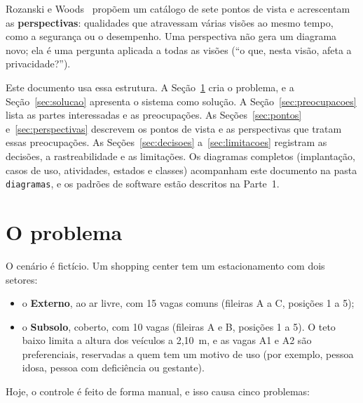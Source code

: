 Rozanski e Woods~\cite{rozanski2011} propõem um catálogo de sete pontos de vista e acrescentam as \textbf{perspectivas}: qualidades que atravessam várias visões ao mesmo tempo, como a segurança ou o desempenho. Uma perspectiva não gera um diagrama novo; ela é uma pergunta aplicada a todas as visões (``o que, nesta visão, afeta a privacidade?'').

Este documento usa essa estrutura. A Seção~\ref{sec:problema} cria o problema, e a Seção~\ref{sec:solucao} apresenta o sistema como solução. A Seção~\ref{sec:preocupacoes} lista as partes interessadas e as preocupações. As Seções~\ref{sec:pontos} e~\ref{sec:perspectivas} descrevem os pontos de vista e as perspectivas que tratam essas preocupações. As Seções~\ref{sec:decisoes} a~\ref{sec:limitacoes} registram as decisões, a rastreabilidade e as limitações. Os diagramas completos (implantação, casos de uso, atividades, estados e classes) acompanham este documento na pasta \texttt{diagramas}, e os padrões de software estão descritos na Parte~1.

\section{O problema}
\label{sec:problema}

O cenário é fictício. Um shopping center tem um estacionamento com dois setores:

\begin{itemize}
  \item o \textbf{Externo}, ao ar livre, com 15 vagas comuns (fileiras A a C, posições 1 a 5);
  \item o \textbf{Subsolo}, coberto, com 10 vagas (fileiras A e B, posições 1 a 5). O teto baixo limita a altura dos veículos a 2,10~m, e as vagas A1 e A2 são preferenciais, reservadas a quem tem um motivo de uso (por exemplo, pessoa idosa, pessoa com deficiência ou gestante).
\end{itemize}

Hoje, o controle é feito de forma manual, e isso causa cinco problemas:

